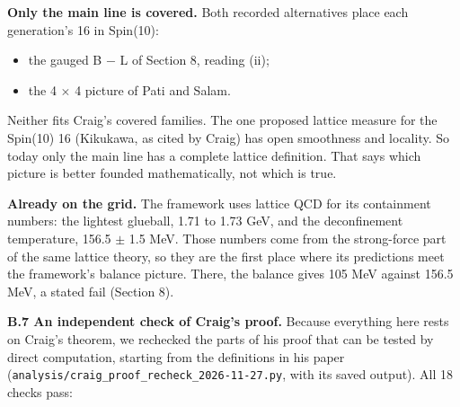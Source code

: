\documentclass[
  11pt,
]{article}
\providecommand{\tightlist}{%
  \setlength{\itemsep}{0pt}\setlength{\parskip}{0pt}}
\begin{document}
\textbf{Only the main line is covered.} Both recorded alternatives place each generation's 16 in Spin(10):

\begin{itemize}
\tightlist
\item
  the gauged B \ensuremath{-} L of Section 8, reading (ii);
\item
  the 4 \ensuremath{\times} 4 picture of Pati and Salam.
\end{itemize}

Neither fits Craig's covered families. The one proposed lattice measure for the Spin(10) 16 (Kikukawa, as cited by Craig) has open smoothness and locality. So today only the main line has a complete lattice definition. That says which picture is better founded mathematically, not which is true.

\textbf{Already on the grid.} The framework uses lattice QCD for its containment numbers: the lightest glueball, 1.71 to 1.73 GeV, and the deconfinement temperature, 156.5 \ensuremath{\pm} 1.5 MeV. Those numbers come from the strong-force part of the same lattice theory, so they are the first place where its predictions meet the framework's balance picture. There, the balance gives 105 MeV against 156.5 MeV, a stated fail (Section 8).

\textbf{B.7 An independent check of Craig's proof.} Because everything here rests on Craig's theorem, we rechecked the parts of his proof that can be tested by direct computation, starting from the definitions in his paper (\texttt{analysis/craig\_proof\_recheck\_2026-11-27.py}, with its saved output). All 18 checks pass:
\end{document}
